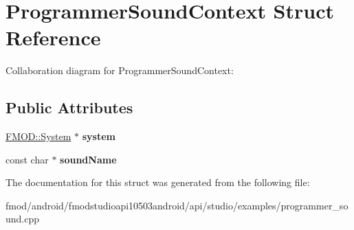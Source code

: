 \hypertarget{struct_programmer_sound_context}{\section{Programmer\+Sound\+Context Struct Reference}
\label{struct_programmer_sound_context}
}


Collaboration diagram for Programmer\+Sound\+Context\+:
\subsection*{Public Attributes}
\begin{DoxyCompactItemize}
\item 
\hypertarget{struct_programmer_sound_context_a29c30b5af0eda5debe1db7602712a991}{\hyperlink{class_f_m_o_d_1_1_system}{F\+M\+O\+D\+::\+System} $\ast$ {\bfseries system}}\label{struct_programmer_sound_context_a29c30b5af0eda5debe1db7602712a991}

\item 
\hypertarget{struct_programmer_sound_context_a1f7b098ec9ed2e3ad12a8e00a9e5d93e}{const char $\ast$ {\bfseries sound\+Name}}\label{struct_programmer_sound_context_a1f7b098ec9ed2e3ad12a8e00a9e5d93e}

\end{DoxyCompactItemize}


The documentation for this struct was generated from the following file\+:\begin{DoxyCompactItemize}
\item 
fmod/android/fmodstudioapi10503android/api/studio/examples/programmer\+\_\+sound.\+cpp\end{DoxyCompactItemize}
